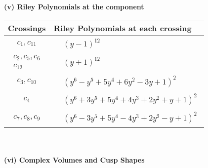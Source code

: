 \documentclass[1p]{elsarticle_modified}
\theoremstyle{definition}
\begin{document}
\newpage\renewcommand{\arraystretch}{1}
\flushleft \textbf{(v) Riley Polynomials at the component}\newline \\
\begin{tabular}{m{50pt}|m{274pt}}
Crossings & \hspace{64pt}Riley Polynomials at each crossing \\
\hline $$\begin{aligned}c_{1},c_{11}\end{aligned}$$&$\begin{aligned}
&(y-1)^{12}
\end{aligned}$\\
\hline $$\begin{aligned}c_{2},c_{5},c_{6}\\c_{12}\end{aligned}$$&$\begin{aligned}
&(y+1)^{12}
\end{aligned}$\\
\hline $$\begin{aligned}c_{3},c_{10}\end{aligned}$$&$\begin{aligned}
&(y^6- y^5+5 y^4+6 y^2-3 y+1)^2
\end{aligned}$\\
\hline $$\begin{aligned}c_{4}\end{aligned}$$&$\begin{aligned}
&(y^6+3 y^5+5 y^4+4 y^3+2 y^2+y+1)^2
\end{aligned}$\\
\hline $$\begin{aligned}c_{7},c_{8},c_{9}\end{aligned}$$&$\begin{aligned}
&(y^6-3 y^5+5 y^4-4 y^3+2 y^2- y+1)^2
\end{aligned}$\\
\hline
\end{tabular}\\~\\
\newpage\flushleft \textbf{(vi) Complex Volumes and Cusp Shapes}
\end{document}
